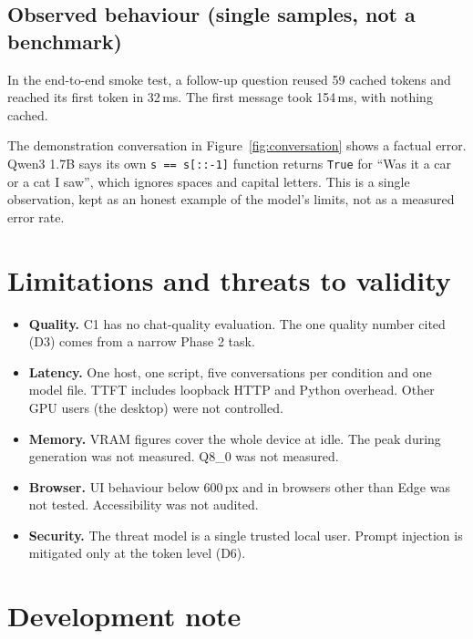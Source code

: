 \documentclass[11pt,a4paper]{article}
\newcommand{\code}[1]{\texttt{#1}}
\begin{document}
\subsection{Observed behaviour (single samples, not a benchmark)}\label{sec:observed}

In the end-to-end smoke test, a follow-up question reused 59 cached tokens and reached
its first token in 32\,ms. The first message took 154\,ms, with nothing cached.

The demonstration conversation in Figure~\ref{fig:conversation} shows a factual error.
Qwen3 1.7B says its own \verb+s == s[::-1]+ function returns \code{True} for ``Was it a
car or a cat I saw'', which ignores spaces and capital letters. This is a single
observation, kept as an honest example of the model's limits, not as a measured error
rate.

\section{Limitations and threats to validity}

\begin{itemize}
  \item \textbf{Quality.} C1 has no chat-quality evaluation. The one quality number cited
        (D3) comes from a narrow Phase 2 task.
  \item \textbf{Latency.} One host, one script, five conversations per condition and one
        model file. TTFT includes loopback HTTP and Python overhead. Other GPU users (the
        desktop) were not controlled.
  \item \textbf{Memory.} VRAM figures cover the whole device at idle. The peak during
        generation was not measured. Q8\_0 was not measured.
  \item \textbf{Browser.} UI behaviour below 600\,px and in browsers other than Edge was
        not tested. Accessibility was not audited.
  \item \textbf{Security.} The threat model is a single trusted local user. Prompt
        injection is mitigated only at the token level (D6).
\end{itemize}

\section{Development note}
\end{document}

